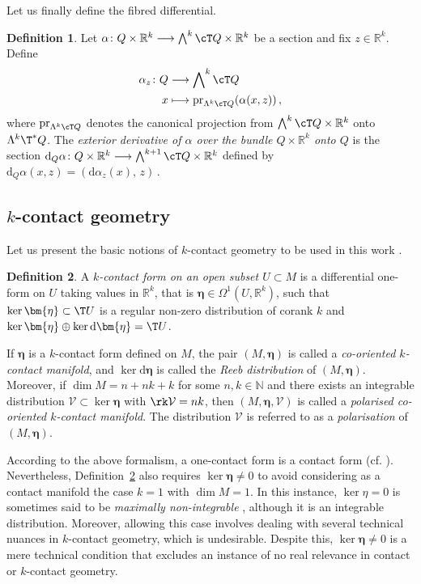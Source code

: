 \documentclass[11pt,a4paper]{article}
\newcommand{\dd}{\mathrm{d}}
\theoremstyle{plain} \newtheorem{theorem}{Theorem}[section] \newtheorem{proposition}[theorem]{Proposition} \newtheorem{corollary}[theorem]{Corollary} \newtheorem{lemma}[theorem]{Lemma} \theoremstyle{definition} \newtheorem{definition}[theorem]{Definition} \theoremstyle{remark} \newtheorem{remark}[theorem]{Remark} \newtheorem{example}[theorem]{Example} %
\begin{document}
Let us finally define the fibred differential. 
\begin{definition}
Let 
\(
\alpha \colon Q \times \mathbb{R}^k \longrightarrow 
\bigwedge\nolimits^k \cT Q \times \mathbb{R}^k
\)
be a section and fix $z\in\mathbb{R}^k$.
Define
\begin{align*}\textstyle
\alpha_z \colon Q &\longrightarrow \bigwedge\nolimits^k \cT Q \\
x & \longmapsto \mathrm{pr}_{\Lambda^k \cT Q}(\alpha(x,z))\,,
\end{align*}
where $\mathrm{pr}_{\Lambda^k \cT Q}$ denotes the canonical projection from $\bigwedge\nolimits^k \cT Q \times \mathbb{R}^k$ onto $\Lambda^k\T^*Q$.
The \emph{exterior derivative of $\alpha$ over the bundle $Q\times \mathbb{R}^k$ onto $Q$} is the section
\(
\dd_Q \alpha \colon Q \times \mathbb{R}^k \longrightarrow
\bigwedge\nolimits^{k+1}\cT Q \times \mathbb{R}^k
\)
defined by
\(
\dd_Q \alpha(x,z) = (\dd \alpha_z(x),\, z)\,.
\)
\end{definition}
\subsection{\texorpdfstring{$k$}--contact geometry}

Let us present the basic notions of $k$-contact geometry to be used in this work \cite{LRS_25,GGMRR_20,GGMRR_21}. 

\begin{definition}\label{def:k-form}
A \textit{$k$-contact form on an open subset $U \subset M$} is a differential one-form on $U$ taking values in $\mathbb{R}^k$, that is $\bm{\eta} \in \Omega^1(U,\mathbb{R}^k)$, such that
 $\ker \bm{\eta} \subset \T U$ is a regular non-zero distribution of corank $k$ and $\ker \bm{\eta} \oplus \ker \dd \bm{\eta} = \T U$.

If $\bm{\eta}$ is a $k$-contact form defined on $M$, the pair $(M,\bm{\eta})$ is called a \textit{co-oriented $k$-contact manifold}, and $\ker \dd \bm{\eta}$ is called the \textit{Reeb distribution} of $(M,\bm{\eta})$. Moreover, if $\dim M = n + nk + k$ for some $n,k \in \mathbb{N}$ and there exists an integrable distribution $\mathcal{V} \subset \ker \bm{\eta}$ with $\rk \mathcal{V} = nk$, then $(M,\bm{\eta},\mathcal{V})$ is called a \textit{polarised co-oriented $k$-contact manifold}. The distribution $\mathcal{V}$ is referred to as a \textit{polarisation} of $(M,\bm{\eta})$.
\end{definition} 

According to the above formalism, a one-contact form is a contact form (cf. \cite{Riv_22}). Nevertheless, Definition~\ref{def:k-form} also requires $\ker \bm{\eta}\neq 0$ to avoid considering as a contact manifold the case $k=1$ with $\dim M=1$. In this instance, $\ker \eta=0$ is sometimes said to be {\it maximally non-integrable} \cite{GG_22}, although it is an integrable distribution. Moreover, allowing this case involves dealing with several technical nuances in $k$-contact geometry, which is undesirable. Despite this,  $\ker \bm{\eta}\neq 0$ is a mere technical condition that excludes an instance of no real relevance in contact or $k$-contact geometry. 
\end{document}
